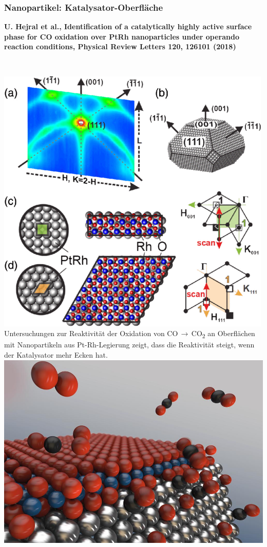 \documentclass[10pt,t]{beamer}
\begin{document}
\begin{frame}
\begin{columns}
\end{columns}
\vspace*{-7pt}
\end{frame}


\begin{frame}
\frametitle{Nanopartikel: Katalysator-Oberfläche}
\vspace*{-2.6\baselineskip}
\alert{\bfseries\footnotesize U. Hejral et al., Identification of a catalytically highly active surface phase for CO oxidation over PtRh nanoparticles under operando reaction conditions, Physical Review Letters 120, 126101 (2018)}
\vspace*{\baselineskip}
\begin{columns}
        ~\\[-\baselineskip]
        \includegraphics[width=\textwidth]{nano-methode}
        Untersuchungen zur Reaktivität der Oxidation von
        CO\,$\rightarrow$\,CO\textsubscript{2} an Oberflächen mit Nanopartikeln
        aus Pt-Rh-Legierung zeigt, dass die Reaktivität steigt, wenn der
        Katalysator mehr Ecken hat.
        \vspace*{1ex}
        \includegraphics[width=\textwidth]{nano-3d}

\end{columns}
\end{frame}
\end{document}
